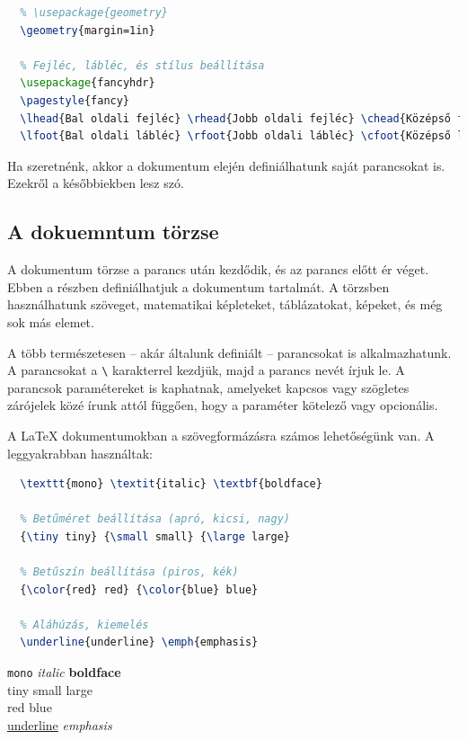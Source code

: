 \begin{lstlisting}[language=tex,caption={Dokuemntum beállításai}]
  % Margók beállítása (\usepackage[margin=1in]{geometry}-vel ekvivalens)
  % \usepackage{geometry}
  \geometry{margin=1in}

  % Fejléc, lábléc, és stílus beállítása
  \usepackage{fancyhdr}
  \pagestyle{fancy}
  \lhead{Bal oldali fejléc} \rhead{Jobb oldali fejléc} \chead{Középső fejléc}
  \lfoot{Bal oldali lábléc} \rfoot{Jobb oldali lábléc} \cfoot{Középső lábléc}
\end{lstlisting}

Ha szeretnénk, akkor a dokumentum elején definiálhatunk saját parancsokat is.
Ezekről a későbbiekben lesz szó.

\subsection{A dokuemntum törzse}

A dokumentum törzse a
parancs után kezdődik, és az
parancs előtt ér véget. Ebben a részben definiálhatjuk a dokumentum tartalmát. A
törzsben használhatunk szöveget, matematikai képleteket, táblázatokat, képeket,
és még sok más elemet.

A több természetesen -- akár általunk definiált -- parancsokat is
alkalmazhatunk. A parancsokat a \texttt{\textbackslash} karakterrel kezdjük,
majd a parancs nevét írjuk le. A parancsok paramétereket is kaphatnak, amelyeket
kapcsos vagy szögletes zárójelek közé írunk attól függően, hogy a paraméter
kötelező vagy opcionális.

A \LaTeX{} dokumentumokban a szövegformázásra számos lehetőségünk van.
A leggyakrabban használtak:

\begin{minipage}[t]{.5\textwidth}
	\begin{lstlisting}[language=tex,caption={Szövegformázási parancsok}]
  % Betűtípus beállítása (mono, dőlt, félkövér)
  \texttt{mono} \textit{italic} \textbf{boldface}

  % Betűméret beállítása (apró, kicsi, nagy)
  {\tiny tiny} {\small small} {\large large}

  % Betűszín beállítása (piros, kék)
  {\color{red} red} {\color{blue} blue}

  % Aláhúzás, kiemelés
  \underline{underline} \emph{emphasis}
\end{lstlisting}
\end{minipage}\hfill%
\begin{minipage}[t]{.4\textwidth}
	\vspace{18pt}
	\texttt{mono} \textit{italic} \textbf{boldface}
	\\[18pt]
	{\tiny tiny} {\small small} {\large large}
	\\[18pt]
	{\color{red} red} {\color{blue} blue}
	\\[14pt]
	\underline{underline} \emph{emphasis}
\end{minipage}

